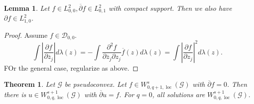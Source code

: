 \documentclass{article}
\newtheorem{theorem}{Theorem} [section]
\newtheorem{lemma}{Lemma}[section]
\DeclareMathOperator{\loc}{loc}
\newcommand{\G}[0]{\mathcal{G}}
\newcommand{\pd}[2]{{\frac {\partial#1} {\partial#2}}}
\begin{document}
\begin{lemma}
  \label{lemma_regularity_theta_dbar}
  Let $f\in L_{0,0}^2,\overline{\partial}f\in L_{0,1}^2$ with compact support. Then we also have $\partial f\in L_{1,0}^2$.
\end{lemma}
\begin{proof}
  Assume $f\in\mathcal{D}_{0,0}$.
  \begin{equation*}
    \int\left\vert \pd{f}{\overline{z}_j}\right\vert d\lambda(z) = -\int{\frac {\partial^2 f}{\partial\overline{z}_j\partial z_j}}\overline{f}(z)d\lambda(z)=\int\left\vert\pd{f}{z_j}\right\vert^2d\lambda(z).
  \end{equation*}
  FOr the general case, regularize as above.
\end{proof}
\begin{theorem}
  Let $\G$ be pseudoconvex. Let $f\in W^s_{0,q+1,\loc}(\G)$ with $\overline{\partial}f=0$. Then there is $u\in W^{s+1}_{0,q,\loc}(\G)$ with $\overline{\partial}u = f$.
  For $q=0$, all solutions are $W^{s+1}_{0,q,\loc}(\G)$.
\end{theorem}
\end{document}
